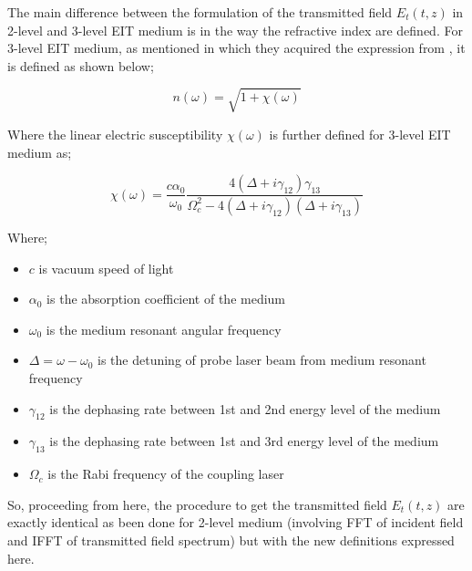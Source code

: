 The main difference between the formulation of the transmitted field $E_{t}(t, z)$ in 2-level and 3-level EIT medium is in the way the refractive index are defined. For 3-level EIT medium, as mentioned in \cite{Jeong2009} which they acquired the expression from \cite{Braje2004}, it is defined as shown below;

\begin{equation}
    n(\omega) = \sqrt{1 + \chi(\omega)}
\end{equation}

Where the linear electric susceptibility $\chi(\omega)$ is further defined for 3-level EIT medium as;

\begin{equation}
    \chi(\omega) = \frac{c\alpha_{0}}{\omega_{0}} \frac{4(\Delta + i\gamma_{12})\gamma_{13}}{\Omega_{c}^{2} - 4(\Delta + i\gamma_{12})(\Delta + i\gamma_{13})}
\end{equation}

Where;

\begin{itemize}
    \item $c$ is vacuum speed of light
    \item $\alpha_{0}$ is the absorption coefficient of the medium
    \item $\omega_{0}$ is the medium resonant angular frequency
    \item $\Delta = \omega - \omega_{0}$ is the detuning of probe laser beam from medium resonant frequency
    \item $\gamma_{12}$ is the dephasing rate between 1st and 2nd energy level of the medium
    \item $\gamma_{13}$ is the dephasing rate between 1st and 3rd energy level of the medium
    \item $\Omega_{c}$ is the Rabi frequency of the coupling laser
\end{itemize}

So, proceeding from here, the procedure to get the transmitted field $E_{t}(t, z)$ are exactly identical as been done for 2-level medium (involving FFT of incident field and IFFT of transmitted field spectrum) but with the new definitions expressed here.

